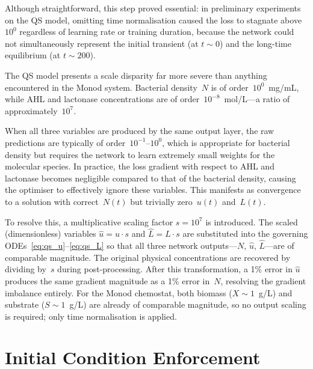\documentclass[14pt,a4paper,openany]{extbook}
\begin{document}
Although straightforward, this step proved essential: in preliminary
experiments on the QS model, omitting time normalisation caused the loss to
stagnate above $10^{0}$ regardless of learning rate or training duration,
because the network could not simultaneously represent the initial transient (at $t \sim 0$) and the long-time equilibrium (at $t \sim 200$).

The QS model presents a scale disparity far more severe than anything
encountered in the Monod system.  Bacterial density~$N$ is of
order~$10^{0}$~mg/mL, while AHL and lactonase concentrations are of
order~$10^{-8}$~mol/L---a ratio of approximately~$10^{7}$.

When all three variables are produced by the same output layer, the raw
predictions are typically of order~$10^{-1}$--$10^{0}$, which is appropriate
for bacterial density but requires the network to learn extremely small
weights for the molecular species.  In practice, the loss gradient with
respect to AHL and lactonase becomes negligible compared to that of the
bacterial density, causing the optimiser to effectively ignore these
variables.  This manifests as convergence to a solution with correct~$N(t)$
but trivially zero~$u(t)$ and~$L(t)$.

To resolve this, a multiplicative scaling factor $s = 10^{7}$ is introduced. The scaled (dimensionless) variables $\hat{u} = u \cdot s$ and
$\hat{L} = L \cdot s$ are substituted into the governing
ODEs~\eqref{eq:qs_u}--\eqref{eq:qs_L} so that all three network
outputs---$N$, $\hat{u}$, $\hat{L}$---are of comparable magnitude.  The
original physical concentrations are recovered by dividing by~$s$ during
post-processing.  After this transformation, a 1\% error in $\hat{u}$
produces the same gradient magnitude as a 1\% error in~$N$, resolving the
gradient imbalance entirely. For the Monod chemostat, both biomass ($X \sim 1$~g/L) and substrate ($S \sim 1$~g/L) are already of comparable magnitude, so no output scaling is required; only time normalisation is applied.

\section{Initial Condition Enforcement}
\label{sec:ic_strategy}
\end{document}
